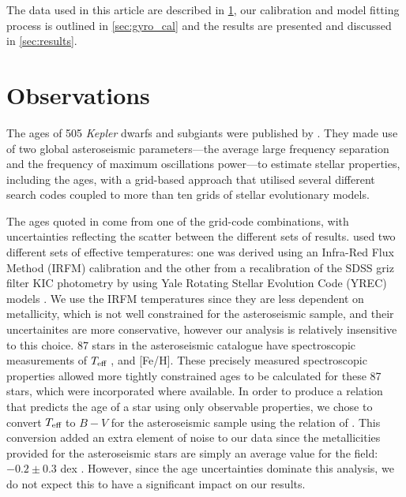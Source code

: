 \documentclass[useAMS, usenatbib]{mn2e}
\newcommand{\teff}{$T_{\rm{eff}}$}
\begin{document}
The data used in this article are described in \textsection \ref{sec:data},
our calibration and model fitting process is outlined in \textsection
\ref{sec:gyro_cal} and the results are presented and discussed in \textsection
\ref{sec:results}.

\section{Observations}
\label{sec:data}

The ages of 505 {\it Kepler} dwarfs and subgiants were published by
\citet{Chaplin2014}.
They made use of two global asteroseismic parameters---the average large
frequency separation and the frequency of maximum oscillations power---to
estimate stellar properties, including the ages, with a grid-based approach
that utilised several different search codes coupled to more than ten grids of
stellar evolutionary models.

The ages quoted in \citet{Chaplin2014} come from one of the grid-code
combinations, with uncertainties reflecting the scatter between the different
sets of results.
\citet{Chaplin2014} used two different sets of effective temperatures: one was
derived using an Infra-Red Flux Method (IRFM) calibration
\citep{Casagrande2010, SilvaAguirre2012} and the other from a recalibration of
the SDSS griz filter KIC photometry by \citet{Pinsonneault2012} using Yale
Rotating Stellar Evolution Code (YREC) models \citep{Demarque2004}.
We use the IRFM temperatures since they are less dependent on metallicity,
which is not well constrained for the asteroseismic sample, and their
uncertainites are more conservative, however our analysis is relatively
insensitive to this choice.
87 stars in the asteroseismic catalogue have spectroscopic measurements of
\teff$~$, and [Fe/H].
These precisely measured spectroscopic properties allowed more tightly
constrained ages to be calculated for these 87 stars, which were
incorporated where available.
In order to produce a relation that predicts the age of a star using only
observable properties, we chose to convert \teff$~$to $B-V$ for the
asteroseismic sample using the relation of \citet{Sekiguchi2000}.
This conversion added an extra element of noise to our data since the
metallicities provided for the asteroseismic stars are simply an average value
for the field: $-0.2\pm0.3$ dex \citep[see e.g.][]{Silva_Aguirre2011}.
However, since the age uncertainties dominate this analysis, we do not expect
this to have a significant impact on our results.
\end{document}
